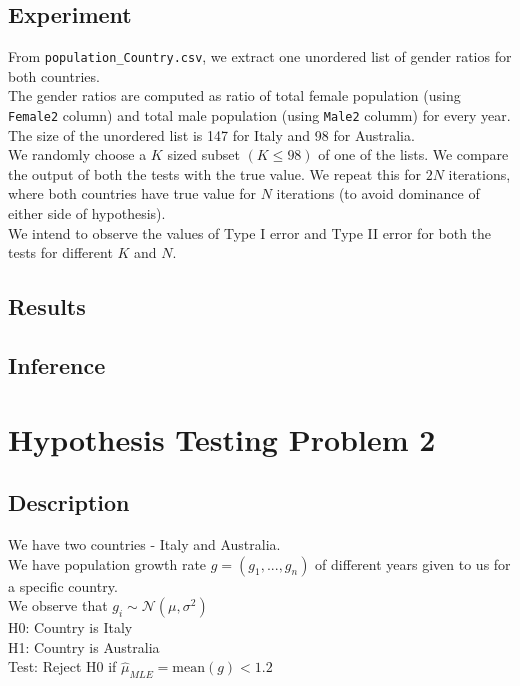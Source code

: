 \documentclass[fleqn, 11pt]{article}
\begin{document}
\subsection{Experiment}
From \verb!population_Country.csv!, we extract one unordered list of gender ratios for both countries. \\
The gender ratios are computed as ratio of total female population (using \verb!Female2! column) and total male population (using \verb!Male2! columm) for every year. \\
The size of the unordered list is 147 for Italy and 98 for Australia. \\
We randomly choose a $K$ sized subset $(K \le 98)$ of one of the lists. We compare the output of both the tests with the true value. We repeat this for $2N$ iterations, where both countries have true value for $N$ iterations (to avoid dominance of either side of hypothesis). \\
We intend to observe the values of Type I error and Type II error for both the tests for different $K$ and $N$.

\subsection{Results}


\subsection{Inference}


\newpage
\section{Hypothesis Testing Problem 2}
\subsection{Description}
We have two countries - Italy and Australia. \\
We have population growth rate $g = (g_1, ..., g_n)$ of different years given to us for a specific country. \\
We observe that $g_i \sim \mathcal{N}(\mu, \sigma^2)$ \\
H0: Country is Italy \\
H1: Country is Australia \\
Test: Reject H0 if $\hat{\mu}_{MLE} = \mathrm{mean}(g) < 1.2$
\end{document}
